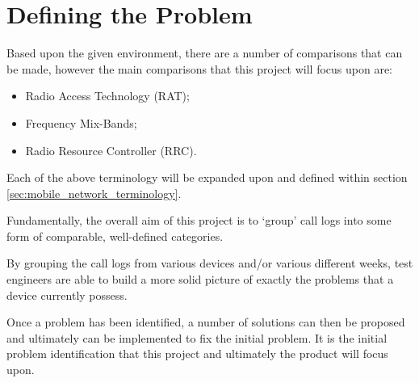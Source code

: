 \section{Defining the Problem}
\label{sec:defining_the_problem}

Based upon the given environment, there are a number of comparisons that can be
made, however the main comparisons that this project will focus upon are:
\begin{itemize}
  \item Radio Access Technology (RAT);
  \item Frequency Mix-Bands;
  \item Radio Resource Controller (RRC).
\end{itemize}

Each of the above terminology will be expanded upon and defined within section 
\ref{sec:mobile_network_terminology}.

Fundamentally, the overall aim of this project is to `group' call logs into 
some form of comparable, well-defined categories.

By grouping the call logs from various devices and/or various different weeks,
test engineers are able to build a more solid picture of exactly the problems
that a device currently possess.

Once a problem has been identified, a number of solutions can then be proposed 
and ultimately can be implemented to fix the initial problem. It is the initial 
problem identification that this project and ultimately the product will focus 
upon.